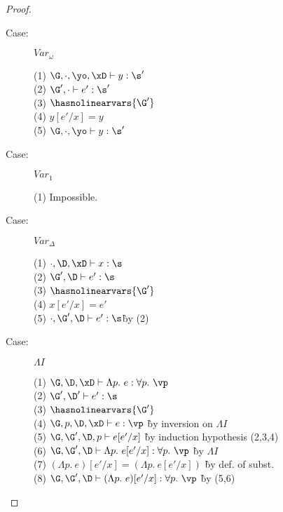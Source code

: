 \begin{proof}
\begin{description}
\item[Case:] $Var_\omega$
\begin{tabbing}
    (1) $\G, \cdot, \yo, \xD \vdash y : \s'$\\
    (2) $\G', \cdot \vdash e' : \s'$\\
    (3) $\hasnolinearvars{\G'}$\\
    (4) $y[e'/x] = y$\\
    (5) $\G, \cdot, \yo \vdash y : \s'$\\
\end{tabbing}

\item[Case:] $Var_1$
\begin{tabbing}
    (1) Impossible.
\end{tabbing}

\item[Case:] $Var_\Delta$
\begin{tabbing}
    (1) $\cdot, \D, \xD \vdash x : \s$\\
    (2) $\G', \D \vdash e' : \s$\\
    (3) $\hasnolinearvars{\G'}$\\
    (4) $x[e'/x] = e'$\\
    (5) $\cdot, \G', \D \vdash e' : \s$\` by (2)\\
\end{tabbing}

\item[Case:] $\Lambda I$
\begin{tabbing}
    (1) $\G,\D, \xD \vdash \Lambda p.~e : \forall p.~\vp$\\
    (2) $\G', \D' \vdash e' : \s$\\
    (3) $\hasnolinearvars{\G'}$\\
    (4) $\G, p, \D, \xD \vdash e : \vp$ \` by inversion on $\Lambda I$\\
    (5) $\G, \G', \D, p \vdash e[e'/x]$ \` by induction hypothesis (2,3,4)\\
    (6) $\G, \G', \D \vdash \Lambda p.~e[e'/x] : \forall p.~\vp$ \` by $\Lambda I$ \\
    (7) $(\Lambda p.~e)[e'/x] = (\Lambda p.~e[e'/x])$ \` by def. of subst.\\
    (8) $\G, \G', \D \vdash (\Lambda p.~e)[e'/x] : \forall p.~\vp$ \` by (5,6)\\
\end{tabbing}


\end{description}
\end{proof}
